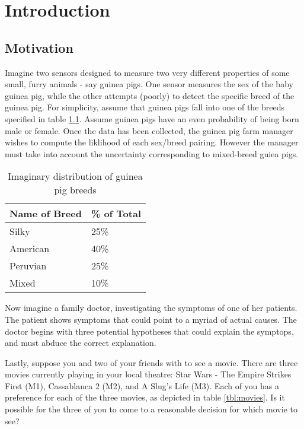 \documentclass[thesis.tex]{subfiles}
\begin{document}
\chapter{Introduction}



\section{Motivation}

Imagine two sensors designed to measure two very different properties of some
small, furry animals - say guinea pigs. One sensor measures the sex of the baby guinea
pig, while the other attempts (poorly) to detect the specific breed of the guinea pig.
For simplicity, assume that guinea pigs fall into one of the breeds specified in table
\ref{tbl:guinea-pig-breeds}. Assume guinea pigs have an even probability of being born
male or female. Once the data has been collected, the guinea pig farm manager wishes to compute the
liklihood of each sex/breed pairing. However the manager must take into account the
uncertainty corresponding to mixed-breed guiea pigs.

\begin{table}
  \begin{center}
    \begin{tabular}{| l | l |}
      \hline
      Name of Breed & \% of Total \\
      \hline
      Silky         & 25\%        \\
      American      & 40\%        \\
      Peruvian      & 25\%        \\
      Mixed         & 10\%        \\
      \hline
    \end{tabular}
  \end{center}

  \caption{Imaginary distribution of guinea pig breeds}
  \label{tbl:guinea-pig-breeds}
\end{table}

Now imagine a family doctor, investigating the symptoms of one of her patients. The patient
shows symptoms that could point to a myriad of actual causes. The doctor begins with three
potential hypotheses that could explain the symptops, and must abduce the correct explanation.

Lastly, suppose you and two of your friends with to see a movie. There are three movies currently
playing in your local theatre: Star Wars - The Empire Strikes First (M1), Cassablanca 2 (M2), and
A Slug's Life (M3). Each of you has a preference for each of the three movies, as depicted in
table \ref{tbl:movies}. Is it possible for the three of you to come to a reasonable decision for
which movie to see?
\end{document}
